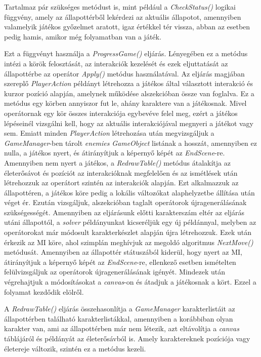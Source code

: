 \documentclass[
]{thesis-ekf}
\theoremstyle{definition}
\theoremstyle{remark}
\begin{document}
Tartalmaz pár szükséges metódust is, mint például a \emph{CheckStatus()} logikai függvény, amely az állapottérből lekérdezi az aktuális állapotot, amennyiben valamelyik játékos győzelmet aratott, igaz értékkel tér vissza, abban az esetben pedig hamis, amikor még folyamatban van a játék. 

Ezt a függvényt használja a \emph{ProgressGame()} eljárás. Lényegében ez a metódus intézi a körök felosztását, az interakciók kezelését és ezek eljuttatását az állapottérbe az operátor \emph{Apply()} metódus használatával. Az eljárás magjában szereplő \emph{PlayerAction} példányt létrehozza a játékos által választott interakció és kurzor pozíció alapján, amelynek működése  alszekcióban össze van foglalva. Ez a metódus egy körben annyiszor fut le, ahány karaktere van a játékosnak. Mivel operátornak egy kör összes interakciója egybevéve felel meg, ezért a játékos lépéseinél vizsgálni kell, hogy az aktuális interakciójával megnyeri a játékot vagy sem. Emiatt minden \emph{PlayerAction} létrehozása után megvizsgáljuk a \emph{GameManager}-ben tárolt \emph{enemies} \emph{GameObject} listának a hosszát, amennyiben ez nulla, a játékos nyert, és átirányítjuk a képernyő képét az \emph{EndScene}-re. Amennyiben nem nyert a játékos, a \emph{RedrawTable()} metódus átalakítja az életerősávot és pozíciót az interakcióknak megfelelően és az ismétlések után létrehozzuk az operátort szintén az interakciók alapján. Ezt alkalmazzuk az állapottéren, a játékos köre pedig a lokális változókat alaphelyzetbe állítása után véget ér. 
Ezután vizsgáljuk,  alszekcióban taglalt operátorok újragenerálásának szükségességét. Amennyiben az eljárásunk előtti karakterszám eltér az eljárás utáni állapottól, a \emph{solver} példányunkat kicseréljük egy új példánnyal, melyben az operátorokat már módosult karakterkészlet alapján újra létrehozzuk. Ezek után érkezik az MI köre, ahol szimplán meghívjuk az megoldó algoritmus \emph{NextMove()} metódusát. Amennyiben az állapottér státuszából kiderül, hogy nyert az MI, átirányítjuk a képernyő képét az \emph{EndScene}-re, ellenkező esetben ismételten felülvizsgáljuk az operátorok újragenerálásának igényét. Mindezek után végrehajtjuk a módosításokat a \emph{canvas}-on és átadjuk a játékosnak a kört. Ezzel a folyamat kezdődik elölről.

A \emph{RedrawTable()} eljárás összehasonlítja a \emph{GameManager} karakterlistáit az állapottérben található karakterlistákkal, amennyiben a korábbiban olyan karakter van, ami az állapottérben már nem létezik, azt eltávolítja a \emph{canvas} táblájáról és példányát az életerősávból is. Amely karaktereknek pozíciója vagy életereje változik, szintén ez a metódus kezeli.
\end{document}
